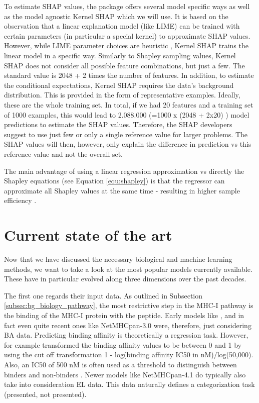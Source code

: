 \documentclass[msc,deptreport,ai]{infthesis} %
\begin{document}
	To estimate \gls{SHAP} values, the package offers several model specific ways as well as the model agnostic Kernel \gls{SHAP} which we will use. It is based on the observation that a linear explanation model (like \gls{LIME}) can be trained with certain parameters (in particular a special kernel) to approximate \gls{SHAP} values. However, while \gls{LIME} parameter choices are heuristic \cite{lundberg_unified_2017}, Kernel \gls{SHAP} trains the linear model in a specific way.
	Similarly to Shapley sampling values, Kernel \gls{SHAP} does not consider all possible feature combinations, but just a few. The standard value is 2048 + 2 times the number of features. In addition, to estimate the conditional expectations, Kernel \gls{SHAP} requires the data's background distribution. This is provided in the form of representative examples. Ideally, these are the whole training set. In total, if we had 20 features and a training set of 1000 examples, this would lead to 2.088.000 (=1000 x (2048 + 2x20) ) model predictions to estimate the \gls{SHAP} values. Therefore, the \gls{SHAP} developers suggest to use just few or only a single reference value for larger problems. The \gls{SHAP} values will then, however, only explain the difference in prediction vs this reference value and not the overall set.
	
	The main advantage of using a linear regression approximation vs directly the Shapley equations (see Equation \ref{equ:shapley}) is that the regressor can approximate all Shapley values at the same time - resulting in higher sample efficiency \cite{lundberg_unified_2017}.

\section{Current state of the art}
Now that we have discussed the necessary biological and machine learning methods, we want to take a look at the most popular models currently available. These have in particular evolved along three dimensions over the past decades. 

The first one regards their input data. As outlined in Subsection \ref{subsec:bg_biology_pathway}, the most restrictive step in the \gls{MHC-I} pathway is the binding of the \gls{MHC-I} protein with the peptide. Early models like \cite{nielsen_reliable_2003}, and in fact even quite recent ones like NetMHCpan-3.0 \cite{nielsen_netmhcpan-30_2016} were, therefore, just considering \gls{BA} data. Predicting binding affinity is theoretically a regression task. However, for example \cite{nielsen_netmhcpan-30_2016} transformed the binding affinity values to be between 0 and 1 by using the cut off transformation 1 - log(binding affinity IC50 in nM)/log(50,000). Also, an IC50 of 500 nM is often used as a threshold to distinguish between binders and non-binders \cite{paul_hla_2013, udaka_empirical_2002, reynisson_netmhcpan-41_2020, odonnell_mhcflurry_2020}. Newer models like NetMHCpan-4.1 \cite{reynisson_netmhcpan-41_2020} do typically also take into consideration \gls{EL} data. This data naturally defines a categorization task (presented, not presented). 
\end{document}
